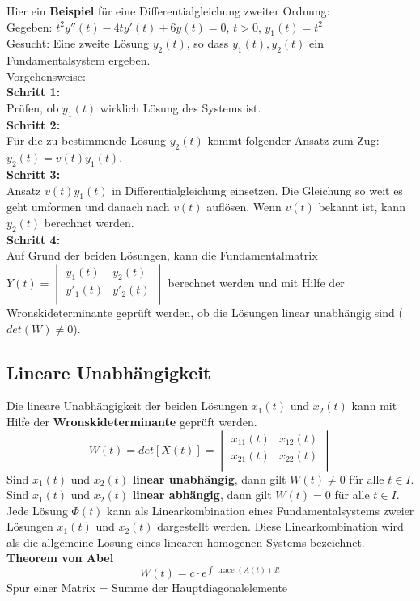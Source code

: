 Hier ein \textbf{Beispiel} für eine Differentialgleichung zweiter Ordnung: \\
Gegeben: $t^2y''(t)-4ty'(t)+6y(t)=0$, $t>0$, $y_1(t)=t^2$\\
Gesucht: Eine zweite Lösung $y_2(t)$, so dass ${y_1(t),y_2(t)}$ ein Fundamentalsystem ergeben. \\
Vorgehensweise: \\
\textbf{Schritt 1:}\\
Prüfen, ob $y_1(t)$ wirklich Lösung des Systems ist. \\
\textbf{Schritt 2:}\\
Für die zu bestimmende Lösung $y_2(t)$ kommt folgender Ansatz zum Zug: $y_2(t) = v(t)y_1(t)$.\\
\textbf{Schritt 3:}\\
Ansatz $v(t)y_1(t)$ in Differentialgleichung einsetzen. Die Gleichung so weit es geht umformen und danach nach $v(t)$ auflösen. Wenn $v(t)$ bekannt ist, kann $y_2(t)$ berechnet werden. \\
\textbf{Schritt 4:}\\
Auf Grund der beiden Lösungen, kann die Fundamentalmatrix $Y(t) =
\begin{vmatrix} 
	        y_{1}(t) & y_{2}(t)\\ 
	        y'_{1}(t) & y'_{2}(t)\\   
\end{vmatrix} $ berechnet werden und mit Hilfe der Wronskideterminante geprüft werden, ob die Lösungen linear unabhängig sind ($det(W) \neq 0$). 

\subsection{Lineare Unabhängigkeit}
Die lineare Unabhängigkeit der beiden Lösungen $x_1(t)$ und $x_2(t)$ kann mit Hilfe der \textbf{Wronskideterminante} geprüft werden. 
\begin{equation*}
	W(t) = det[X(t)] =    
	\begin{vmatrix} 
	        x_{11}(t) & x_{12}(t)\\ 
	        x_{21}(t) & x_{22}(t)\\   
	\end{vmatrix}
\end{equation*}
Sind $x_1(t)$ und $x_2(t)$ \textbf{linear unabhängig}, dann gilt $W(t) \neq 0$ für alle $t \in I$. \\
Sind $x_1(t)$ und $x_2(t)$ \textbf{linear abhängig}, dann gilt $W(t) = 0$ für alle $t \in I$. \\
Jede Lösung $\Phi(t)$ kann als Linearkombination eines Fundamentalsystems zweier Lösungen $x_1(t)$ und $x_2(t)$ dargestellt werden. Diese Linearkombination wird als die allgemeine Lösung eines linearen homogenen Systems bezeichnet. \\
\textbf{Theorem von Abel}\\
\begin{equation*}
W(t) = c\cdot e^{\int{\operatorname{trace}(A(t))dt}}
\end{equation*}
Spur einer Matrix = Summe der Hauptdiagonalelemente
